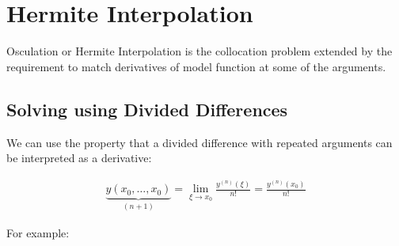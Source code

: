 \section{Hermite Interpolation}

Osculation or Hermite Interpolation is the collocation problem extended by the requirement to match
derivatives of model function at some of the arguments.

\subsection{Solving using Divided Differences}

We can use the property that a divided difference with repeated arguments can be interpreted as a derivative:

\begin{align*}
    \underbrace{y(x_0,\ldots,x_0)}_{(n+1)}=\lim_{\xi\to x_0}\frac{y^{(n)}(\xi)}{n!}=\frac{y^{(n)}(x_0)}{n!}
\end{align*}

For example:

